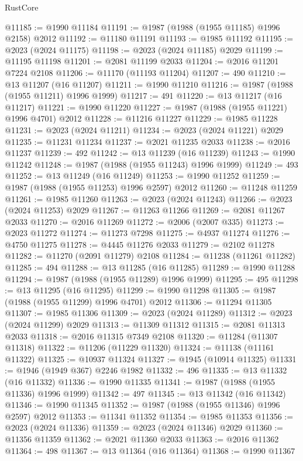 \begin{lexlean}{RustCore}
\begin{coremodule}
@11185 := @1990 @11184
@11191 := @1987 (@1988 (@1955 @11185) @1996 @2158) @2012
@11192 := @11180 @11191
@11193 := @1985 @11192
@11195 := @2023 (@2024 @11175)
@11198 := @2023 (@2024 @11185) @2029
@11199 := @11195 @11198
@11201 := @2081 @11199 @2033
@11204 := @2016 @11201 @7224 @2108
@11206 := @11170 (@11193 @11204)
@11207 := 490
@11210 := @13 @11207 (@16 @11207)
@11211 := @1990 @11210
@11216 := @1987 (@1988 (@1955 @11211) @1996 @1999)
@11217 := 491
@11220 := @13 @11217 (@16 @11217)
@11221 := @1990 @11220
@11227 := @1987 (@1988 (@1955 @11221) @1996 @4701) @2012
@11228 := @11216 @11227
@11229 := @1985 @11228
@11231 := @2023 (@2024 @11211)
@11234 := @2023 (@2024 @11221) @2029
@11235 := @11231 @11234
@11237 := @2021 @11235 @2033
@11238 := @2016 @11237
@11239 := 492
@11242 := @13 @11239 (@16 @11239)
@11243 := @1990 @11242
@11248 := @1987 (@1988 (@1955 @11243) @1996 @1999)
@11249 := 493
@11252 := @13 @11249 (@16 @11249)
@11253 := @1990 @11252
@11259 := @1987 (@1988 (@1955 @11253) @1996 @2597) @2012
@11260 := @11248 @11259
@11261 := @1985 @11260
@11263 := @2023 (@2024 @11243)
@11266 := @2023 (@2024 @11253) @2029
@11267 := @11263 @11266
@11269 := @2081 @11267 @2033
@11270 := @2016 @11269
@11272 := @2006 (@2007 @335)
@11273 := @2023 @11272
@11274 := @11273 @7298
@11275 := @4937 @11274
@11276 := @4750 @11275
@11278 := @4445 @11276 @2033
@11279 := @2102 @11278
@11282 := @11270 (@2091 @11279) @2108
@11284 := @11238 (@11261 @11282)
@11285 := 494
@11288 := @13 @11285 (@16 @11285)
@11289 := @1990 @11288
@11294 := @1987 (@1988 (@1955 @11289) @1996 @1999)
@11295 := 495
@11298 := @13 @11295 (@16 @11295)
@11299 := @1990 @11298
@11305 := @1987 (@1988 (@1955 @11299) @1996 @4701) @2012
@11306 := @11294 @11305
@11307 := @1985 @11306
@11309 := @2023 (@2024 @11289)
@11312 := @2023 (@2024 @11299) @2029
@11313 := @11309 @11312
@11315 := @2081 @11313 @2033
@11318 := @2016 @11315 @7349 @2108
@11320 := @11284 (@11307 @11318)
@11322 := @11206 (@11229 @11320)
@11324 := @11138 (@11161 @11322)
@11325 := @10937 @11324
@11327 := @1945 (@10914 @11325)
@11331 := @1946 (@1949 @367) @2246 @1982
@11332 := 496
@11335 := @13 @11332 (@16 @11332)
@11336 := @1990 @11335
@11341 := @1987 (@1988 (@1955 @11336) @1996 @1999)
@11342 := 497
@11345 := @13 @11342 (@16 @11342)
@11346 := @1990 @11345
@11352 := @1987 (@1988 (@1955 @11346) @1996 @2597) @2012
@11353 := @11341 @11352
@11354 := @1985 @11353
@11356 := @2023 (@2024 @11336)
@11359 := @2023 (@2024 @11346) @2029
@11360 := @11356 @11359
@11362 := @2021 @11360 @2033
@11363 := @2016 @11362
@11364 := 498
@11367 := @13 @11364 (@16 @11364)
@11368 := @1990 @11367

\end{coremodule}
\end{lexlean}

